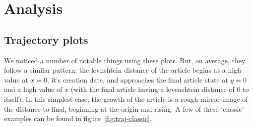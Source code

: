 \section{Analysis}
\subsection*{Trajectory plots}
We noticed a number of notable things using these plots. But, on
average, they follow a similar pattern: the levnshtein distance of the
article begins at a high value at $x=0$, it's creation date, and
approaches the final article state at $y=0$ and a high value of $x$
(with the final article having a levenshtein distance of $0$ to
itself). In this simplest case, the growth of the article is a rough
mirror-image of the distance-to-final, beginning at the origin and
rising. A few of these `classic' examples can be found in
figure~\ref{fig:traj-classic}.

